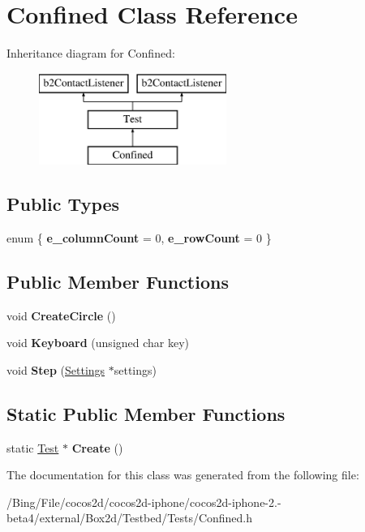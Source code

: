 \hypertarget{class_confined}{\section{Confined Class Reference}
\label{class_confined}
}
Inheritance diagram for Confined\-:\begin{figure}[H]
\begin{center}
\leavevmode
\includegraphics[height=3.000000cm]{class_confined}
\end{center}
\end{figure}
\subsection*{Public Types}
\begin{DoxyCompactItemize}
\item 
enum \{ {\bfseries e\-\_\-column\-Count} =  0, 
{\bfseries e\-\_\-row\-Count} =  0
 \}
\end{DoxyCompactItemize}
\subsection*{Public Member Functions}
\begin{DoxyCompactItemize}
\item 
\hypertarget{class_confined_ac44ed0b333f9a06c70e2c31e25adba87}{void {\bfseries Create\-Circle} ()}\label{class_confined_ac44ed0b333f9a06c70e2c31e25adba87}

\item 
\hypertarget{class_confined_a862c0f0a09ef2bb4bbf3199806e9605d}{void {\bfseries Keyboard} (unsigned char key)}\label{class_confined_a862c0f0a09ef2bb4bbf3199806e9605d}

\item 
\hypertarget{class_confined_a151cd2480e8f0225de6d6307939e8470}{void {\bfseries Step} (\hyperlink{struct_settings}{Settings} $\ast$settings)}\label{class_confined_a151cd2480e8f0225de6d6307939e8470}

\end{DoxyCompactItemize}
\subsection*{Static Public Member Functions}
\begin{DoxyCompactItemize}
\item 
\hypertarget{class_confined_a344bed20c1f2b1fa66e28f6c5f88b891}{static \hyperlink{class_test}{Test} $\ast$ {\bfseries Create} ()}\label{class_confined_a344bed20c1f2b1fa66e28f6c5f88b891}

\end{DoxyCompactItemize}


The documentation for this class was generated from the following file\-:\begin{DoxyCompactItemize}
\item 
/\-Bing/\-File/cocos2d/cocos2d-\/iphone/cocos2d-\/iphone-\/2.-\/beta4/external/\-Box2d/\-Testbed/\-Tests/Confined.\-h\end{DoxyCompactItemize}
